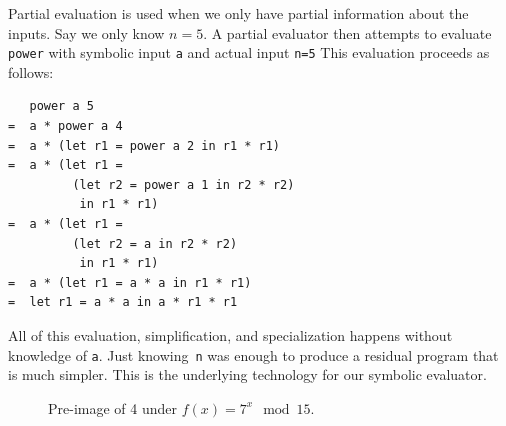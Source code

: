 \documentclass[aps,prl,twocolumn,superscriptaddress,floatfix,notitlepage]{revtex4-2}
\newcommand{\h}[1]{\texttt{#1}}
\begin{document}
Partial evaluation is used when we only have partial information about
the inputs. Say we only know $n=5$. A partial evaluator then attempts
to evaluate \h{power} with symbolic input \h{a} and actual input
\h{n=5}  This evaluation proceeds as follows:
\begin{verbatim}
   power a 5 
=  a * power a 4 
=  a * (let r1 = power a 2 in r1 * r1)
=  a * (let r1 = 
         (let r2 = power a 1 in r2 * r2) 
          in r1 * r1)
=  a * (let r1 = 
         (let r2 = a in r2 * r2) 
          in r1 * r1)
=  a * (let r1 = a * a in r1 * r1)
=  let r1 = a * a in a * r1 * r1
\end{verbatim}
All of this evaluation, simplification, and specialization happens
without knowledge of \h{a}. Just knowing~\h{n} was enough to
produce a residual program that is much simpler. This is the underlying technology for 
our symbolic evaluator.

\begin{figure}[htb]
\begin{center}
\end{center}
\caption{\label{fig:preimage}Pre-image of 4 under $f(x) = 7^x \mod 15$.}
\end{figure}
\end{document}
